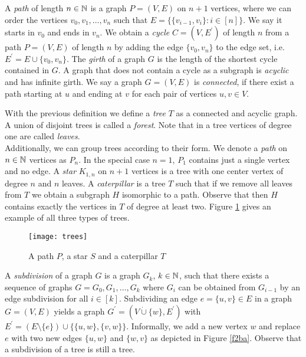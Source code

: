 A \textit{path} of length $n\in\mathbb{N}$ is a graph $P=(V,E)$ on $n+1$ vertices, where we can order the vertices $v_0, v_1, \dots ,v_n$ such that $E=\lbrace\lbrace v_{i-1},v_i\rbrace : i\in [n]\rbrace$. We say it starts in $v_0$ and ends in $v_n$. We obtain a \textit{cycle} $C=(V,E^\prime)$ of length $n$ from a path $P=(V,E)$ of length $n$ by adding the edge $\lbrace v_0,v_n\rbrace$ to the edge set, i.e. $E^\prime = E\cup\lbrace v_0,v_n\rbrace$. The \textit{girth} of a graph $G$ is the length of the shortest cycle contained in $G$. A graph that does not contain a cycle as a subgraph is \textit{acyclic} and has infinite girth. We say a graph $G=(V,E)$ is \textit{connected}, if there exist a path starting at $u$ and ending at $v$ for each pair of vertices $u,v\in V$.

With the previous definition we define a \textit{tree} $T$ as a connected and acyclic graph. A union of disjoint trees is called a \textit{forest}. Note that in a tree vertices of degree one are called \textit{leaves}.\\

Additionally, we can group trees according to their form. We denote a \textit{path} on $n\in\mathbb{N}$ vertices as $P_n$. In the special case $n=1$, $P_1$ contains just a single vertex and no edge. A \textit{star} $K_{1,n}$ on $n+1$ vertices is a tree with one center vertex of degree $n$ and $n$ leaves. A \textit{caterpillar} is a tree $T$ such that if we remove all leaves from $T$ we obtain a subgraph $H$ isomorphic to a path. Observe that then $H$ contains exactly the vertices in $T$ of degree at least two. Figure \ref{f3ba} gives an example of all three types of trees.

\begin{figure}[ht]
\begin{center}
\texttt{[image: trees]}
\end{center}
\caption{A path $P$, a star $S$ and a caterpillar $T$}
\label{f3ba}
\end{figure}

A \textit{subdivision} of a graph $G$ is a graph $G_k$, $k\in\mathbb{N}$, such that there exists a sequence of graphs $G=G_0,G_1,\dots ,G_k$ where $G_i$ can be obtained from $G_{i-1}$ by an edge subdivision for all $i\in [k]$. Subdividing an edge $e=\lbrace u,v\rbrace\in E$ in a graph $G=(V,E)$ yields a graph $G^\prime =(V\dot{\cup} \lbrace w\rbrace, E^\prime )$ with $E^\prime =(E\setminus \lbrace e\rbrace ) \cup \lbrace \lbrace u,w\rbrace, \lbrace v,w \rbrace\rbrace$. Informally, we add a new vertex $w$ and replace $e$ with two new edges $\lbrace u,w\rbrace$ and $\lbrace w,v\rbrace$ as depicted in Figure \ref{f2ba}. Observe that a subdivision of a tree is still a tree.\\

